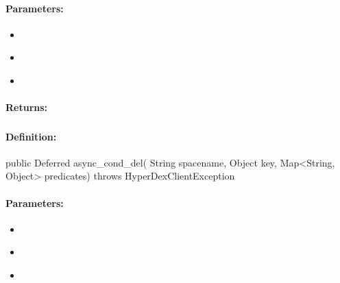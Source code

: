 \paragraph{Parameters:}
\begin{itemize}[noitemsep]
\item {}\\

\item {}\\

\item {}\\

\end{itemize}

\paragraph{Returns:}


\pagebreak
\subsubsection{}
\label{api:java:async_cond_del}


\paragraph{Definition:}
\begin{javacode}
public Deferred async_cond_del(
        String spacename,
        Object key,
        Map<String, Object> predicates) throws HyperDexClientException
\end{javacode}

\paragraph{Parameters:}
\begin{itemize}[noitemsep]
\item {}\\

\item {}\\

\item {}\\

\end{itemize}

